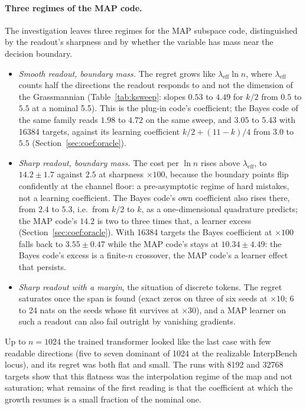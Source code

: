 \documentclass[11pt,a4paper]{article}
\begin{document}
\paragraph{Three regimes of the MAP code.} The investigation leaves three regimes for the MAP subspace code, distinguished by the readout's sharpness and by whether the variable has mass near the decision boundary.
\begin{itemize}
\item \emph{Smooth readout, boundary mass.} The regret grows like $\lambda_{\mathrm{eff}}\ln n$, where $\lambda_{\mathrm{eff}}$ counts half the directions the readout responds to and not the dimension of the Grassmannian (Table~\ref{tab:ksweep}: slopes $0.53$ to $4.49$ for $k/2$ from $0.5$ to $5.5$ at a nominal 5.5). This is the plug-in code's coefficient; the Bayes code of the same family reads $1.98$ to $4.72$ on the same sweep, and $3.05$ to $5.43$ with 16384 targets, against its learning coefficient $k/2+(11-k)/4$ from $3.0$ to $5.5$ (Section~\ref{sec:coef:oracle}).
\item \emph{Sharp readout, boundary mass.} The cost per $\ln n$ rises above $\lambda_{\mathrm{eff}}$, to $14.2\pm1.7$ against $2.5$ at sharpness $\times100$, because the boundary points flip confidently at the channel floor: a pre-asymptotic regime of hard mistakes, not a learning coefficient. The Bayes code's own coefficient also rises there, from $2.4$ to $5.3$, i.e.\ from $k/2$ to $k$, as a one-dimensional quadrature predicts; the MAP code's $14.2$ is two to three times that, a learner excess (Section~\ref{sec:coef:oracle}). With 16384 targets the Bayes coefficient at $\times100$ falls back to $3.55\pm0.47$ while the MAP code's stays at $10.34\pm4.49$: the Bayes code's excess is a finite-$n$ crossover, the MAP code's a learner effect that persists.
\item \emph{Sharp readout with a margin}, the situation of discrete tokens. The regret saturates once the span is found (exact zeros on three of six seeds at $\times10$; 6 to 24 nats on the seeds whose fit survives at $\times30$), and a MAP learner on such a readout can also fail outright by vanishing gradients.
\end{itemize}
Up to $n=1024$ the trained transformer looked like the last case with few readable directions (five to seven dominant of 1024 at the realizable InterpBench locus), and its regret was both flat and small. The runs with 8192 and 32768 targets show that this flatness was the interpolation regime of the map and not saturation; what remains of the first reading is that the coefficient at which the growth resumes is a small fraction of the nominal one.
\end{document}
